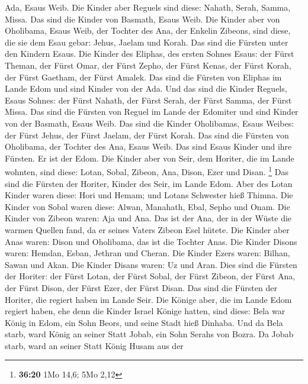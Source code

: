Ada, Esaus Weib.  Die Kinder aber Reguels sind diese:
Nahath, Serah, Samma, Missa. Das sind die Kinder von Basmath, Esaus
Weib.  Die Kinder aber von Oholibama, Esaus Weib, der
Tochter des Ana, der Enkelin Zibeons, sind diese, die sie dem Esau
gebar: Jehus, Jaelam und Korah.  Das sind die Fürsten
unter den Kindern Esaus. Die Kinder des Eliphas, des ersten Sohnes
Esaus: der Fürst Theman, der Fürst Omar, der Fürst Zepho, der Fürst
Kenas,  der Fürst Korah, der Fürst Gaetham, der Fürst
Amalek. Das sind die Fürsten von Eliphas im Lande Edom und sind Kinder
von der Ada.  Und das sind die Kinder Reguels, Esaus
Sohnes: der Fürst Nahath, der Fürst Serah, der Fürst Samma, der Fürst
Missa. Das sind die Fürsten von Reguel im Lande der Edomiter und sind
Kinder von der Basmath, Esaus Weib.  Das sind die Kinder
Oholibamas, Esaus Weibes: der Fürst Jehus, der Fürst Jaelam, der Fürst
Korah. Das sind die Fürsten von Oholibama, der Tochter des Ana, Esaus
Weib.  Das sind Esaus Kinder und ihre Fürsten. Er ist der
Edom.  Die Kinder aber von Seir, dem Horiter, die im
Lande wohnten, sind diese: Lotan, Sobal, Zibeon, Ana, Dison, Ezer und
Disan. \footnote{\textbf{36:20} 1Mo 14,6; 5Mo 2,12}  Das
sind die Fürsten der Horiter, Kinder des Seir, im Lande Edom.
 Aber des Lotan Kinder waren diese: Hori und Hemam; und
Lotans Schwester hieß Thimna.  Die Kinder von Sobal waren
diese: Alwan, Manahath, Ebal, Sepho und Onam.  Die Kinder
von Zibeon waren: Aja und Ana. Das ist der Ana, der in der Wüste die
warmen Quellen fand, da er seines Vaters Zibeon Esel hütete.
 Die Kinder aber Anas waren: Dison und Oholibama, das ist
die Tochter Anas.  Die Kinder Disons waren: Hemdan,
Esban, Jethran und Cheran.  Die Kinder Ezers waren:
Bilhan, Sawan und Akan.  Die Kinder Disans waren: Uz und
Aran.  Dies sind die Fürsten der Horiter: der Fürst
Lotan, der Fürst Sobal, der Fürst Zibeon, der Fürst Ana, 
der Fürst Dison, der Fürst Ezer, der Fürst Disan. Das sind die Fürsten
der Horiter, die regiert haben im Lande Seir.  Die Könige
aber, die im Lande Edom regiert haben, ehe denn die Kinder Israel Könige
hatten, sind diese:  Bela war König in Edom, ein Sohn
Beors, und seine Stadt hieß Dinhaba.  Und da Bela starb,
ward König an seiner Statt Jobab, ein Sohn Serahs von Bozra.
 Da Jobab starb, ward an seiner Statt König Husam aus der
